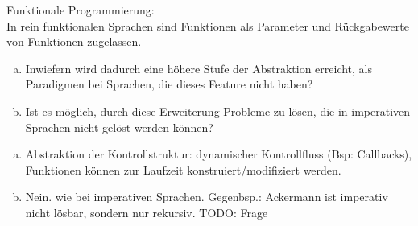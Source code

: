 \begin{card}
	Funktionale Programmierung:\\
	In rein funktionalen Sprachen sind Funktionen als Parameter und Rückgabewerte von Funktionen zugelassen.
	\begin{enumerate}[a)]
	\item  Inwiefern wird dadurch eine höhere Stufe der Abstraktion erreicht, als Paradigmen bei Sprachen, die dieses Feature nicht haben?
	\item Ist es möglich, durch diese Erweiterung Probleme zu lösen, die in imperativen Sprachen nicht gelöst werden können?
	\end{enumerate}
	\hr
	\begin{enumerate}[a)]
	\item Abstraktion der Kontrollstruktur: dynamischer Kontrollfluss (Bsp: Callbacks), Funktionen können zur Laufzeit konstruiert/modifiziert werden.
	\item  Nein. wie bei imperativen Sprachen. Gegenbsp.: Ackermann ist imperativ nicht lösbar, sondern nur rekursiv. TODO: Frage
	\end{enumerate}
\end{card}
